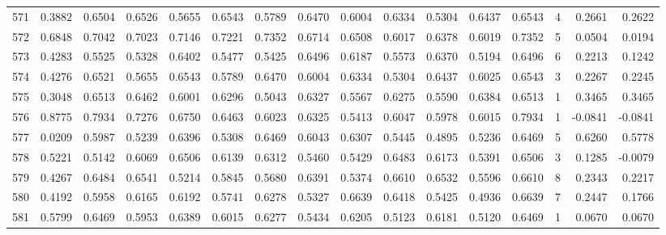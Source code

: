\begin{tabular}{lrrrrrrrrrrrrrrr}
571 &      0.3882 &  0.6504 &  0.6526 &  0.5655 &  0.6543 &  0.5789 &  0.6470 &  0.6004 &  0.6334 &  0.5304 &   0.6437 &     0.6543 &      4 &                    0.2661 &                     0.2622 \\
572 &      0.6848 &  0.7042 &  0.7023 &  0.7146 &  0.7221 &  0.7352 &  0.6714 &  0.6508 &  0.6017 &  0.6378 &   0.6019 &     0.7352 &      5 &                    0.0504 &                     0.0194 \\
573 &      0.4283 &  0.5525 &  0.5328 &  0.6402 &  0.5477 &  0.5425 &  0.6496 &  0.6187 &  0.5573 &  0.6370 &   0.5194 &     0.6496 &      6 &                    0.2213 &                     0.1242 \\
574 &      0.4276 &  0.6521 &  0.5655 &  0.6543 &  0.5789 &  0.6470 &  0.6004 &  0.6334 &  0.5304 &  0.6437 &   0.6025 &     0.6543 &      3 &                    0.2267 &                     0.2245 \\
575 &      0.3048 &  0.6513 &  0.6462 &  0.6001 &  0.6296 &  0.5043 &  0.6327 &  0.5567 &  0.6275 &  0.5590 &   0.6384 &     0.6513 &      1 &                    0.3465 &                     0.3465 \\
576 &      0.8775 &  0.7934 &  0.7276 &  0.6750 &  0.6463 &  0.6023 &  0.6325 &  0.5413 &  0.6047 &  0.5978 &   0.6015 &     0.7934 &      1 &                   -0.0841 &                    -0.0841 \\
577 &      0.0209 &  0.5987 &  0.5239 &  0.6396 &  0.5308 &  0.6469 &  0.6043 &  0.6307 &  0.5445 &  0.4895 &   0.5236 &     0.6469 &      5 &                    0.6260 &                     0.5778 \\
578 &      0.5221 &  0.5142 &  0.6069 &  0.6506 &  0.6139 &  0.6312 &  0.5460 &  0.5429 &  0.6483 &  0.6173 &   0.5391 &     0.6506 &      3 &                    0.1285 &                    -0.0079 \\
579 &      0.4267 &  0.6484 &  0.6541 &  0.5214 &  0.5845 &  0.5680 &  0.6391 &  0.5374 &  0.6610 &  0.6532 &   0.5596 &     0.6610 &      8 &                    0.2343 &                     0.2217 \\
580 &      0.4192 &  0.5958 &  0.6165 &  0.6192 &  0.5741 &  0.6278 &  0.5327 &  0.6639 &  0.6418 &  0.5425 &   0.4936 &     0.6639 &      7 &                    0.2447 &                     0.1766 \\
581 &      0.5799 &  0.6469 &  0.5953 &  0.6389 &  0.6015 &  0.6277 &  0.5434 &  0.6205 &  0.5123 &  0.6181 &   0.5120 &     0.6469 &      1 &                    0.0670 &                     0.0670 \\

\end{tabular}

